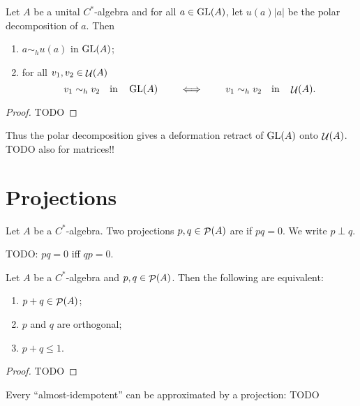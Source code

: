 \begin{proposition} \label{unitariesRetractionOfGL}
Let $A$ be a unital $C^*$-algebra and for all $a\in\operatorname{GL}(A)$, let $u(a)|a|$ be the polar decomposition of $a$. Then
\begin{enumerate}
\item $a\sim_h u(a)$ in $\operatorname{GL}(A)$;
\item for all $v_1,v_2\in\mathop{\mathcal{U}}\nolimits(A)$
\[ v_1\sim_h v_2 \quad \text{in}\quad \operatorname{GL}(A) \qquad \iff \qquad v_1\sim_h v_2 \quad \text{in}\quad \mathop{\mathcal{U}}\nolimits(A). \]
\end{enumerate}
\end{proposition}
\begin{proof}
TODO
\end{proof}
Thus the polar decomposition gives a deformation retract of $\operatorname{GL}(A)$ onto $\mathop{\mathcal{U}}\nolimits(A)$.
TODO also for matrices!!


\section{Projections}
\begin{definition}
Let $A$ be a $C^*$-algebra. Two projections $p,q\in\mathop{\mathcal{P}}\nolimits(A)$ are  if $pq = 0$. We write $p \perp q$.
\end{definition}
TODO: $pq = 0$ iff $qp = 0$.

\begin{lemma}
Let $A$ be a $C^*$-algebra and $p,q\in\mathop{\mathcal{P}}\nolimits(A)$. Then the following are equivalent:
\begin{enumerate}
\item $p+q \in \mathop{\mathcal{P}}\nolimits(A)$;
\item $p$ and $q$ are orthogonal;
\item $p+q \leq 1$.
\end{enumerate}
\end{lemma}
\begin{proof}
TODO
\end{proof}
Every ``almost-idempotent'' can be approximated by a projection:
TODO

